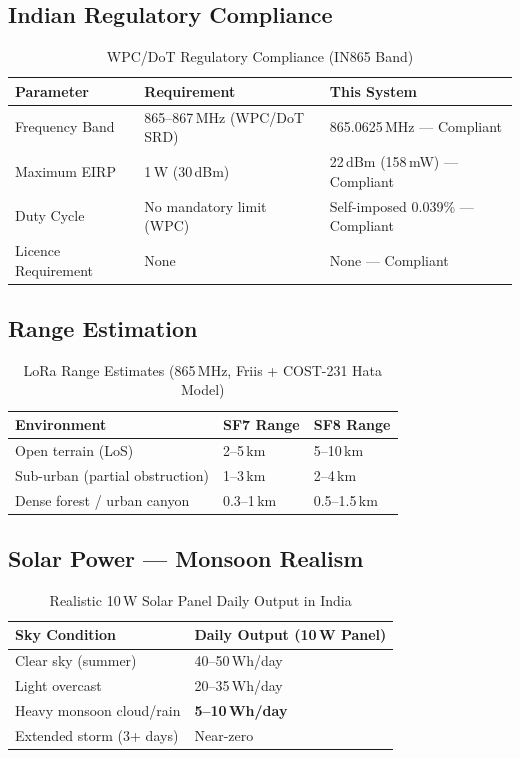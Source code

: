 \documentclass[12pt,a4paper]{article}
\begin{document}
\subsection{Indian Regulatory Compliance}

\begin{table}[h!]
\centering
\caption{WPC/DoT Regulatory Compliance (IN865 Band)}
\begin{tabular}{L{4cm} L{5cm} L{5cm}}
\toprule
\textbf{Parameter} & \textbf{Requirement} & \textbf{This System} \\
\midrule
Frequency Band & 865--867\,MHz (WPC/DoT SRD) & 865.0625\,MHz --- Compliant \\
Maximum EIRP & 1\,W (30\,dBm) & 22\,dBm (158\,mW) --- Compliant \\
Duty Cycle & No mandatory limit (WPC) & Self-imposed 0.039\% --- Compliant \\
Licence Requirement & None & None --- Compliant \\
\bottomrule
\end{tabular}
\end{table}

\subsection{Range Estimation}

\begin{table}[h!]
\centering
\caption{LoRa Range Estimates (865\,MHz, Friis + COST-231 Hata Model)}
\begin{tabular}{L{5cm} C{3.5cm} C{3.5cm}}
\toprule
\textbf{Environment} & \textbf{SF7 Range} & \textbf{SF8 Range} \\
\midrule
Open terrain (LoS) & 2--5\,km & 5--10\,km \\
Sub-urban (partial obstruction) & 1--3\,km & 2--4\,km \\
Dense forest / urban canyon & 0.3--1\,km & 0.5--1.5\,km \\
\bottomrule
\end{tabular}
\end{table}

\subsection{Solar Power --- Monsoon Realism}

\begin{table}[h!]
\centering
\caption{Realistic 10\,W Solar Panel Daily Output in India}
\begin{tabular}{L{6cm} C{5cm}}
\toprule
\textbf{Sky Condition} & \textbf{Daily Output (10\,W Panel)} \\
\midrule
Clear sky (summer) & 40--50\,Wh/day \\
Light overcast & 20--35\,Wh/day \\
Heavy monsoon cloud/rain & \textbf{5--10\,Wh/day} \\
Extended storm (3+ days) & Near-zero \\
\bottomrule
\end{tabular}
\end{table}
\end{document}
